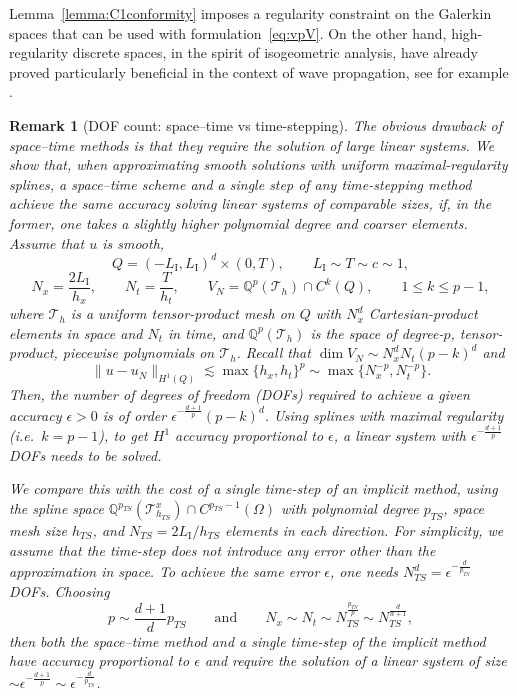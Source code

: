 \documentclass[a4paper]{article}
\theoremstyle{plain}
\newtheorem{remark}[theorem]{Remark}
\theoremstyle{definition}
\newcommand{\LI}{L_{\mathrm I}}
\begin{document}
Lemma~\ref{lemma:C1conformity} imposes a regularity constraint on the Galerkin spaces that can be used with formulation~\eqref{eq:vpV}.
On the other hand, high-regularity discrete spaces, in the spirit of isogeometric analysis, have already proved particularly beneficial in the context of wave propagation, see for example \cite{HughesRealiSangalli2008, PavarinoZampieri2021, FraschiniLoliMoiolaSangalli2023}.

\begin{remark}[DOF count: space--time vs time-stepping]\label{rem:DOFcount}
The obvious drawback of space--time methods is that they require the solution of large linear systems.
We show that,
when approximating smooth solutions with uniform
maximal-regularity splines,
a space--time scheme and a single step of any time-stepping method achieve the same accuracy solving linear systems of comparable sizes, if, in the former, one takes a slightly higher polynomial degree and coarser elements.
Assume that $u$ is smooth,
	\begin{equation*}
		Q = \left(-\LI, \LI \right)^d\times(0,T), \qquad \LI\sim T\sim c\sim1,
	\end{equation*}
	\begin{equation*}
		N_x  = \frac{2\LI}{h_x}, \qquad N_t = \frac{T}{h_t}, \qquad V_N = \mathbb Q^p(\mathcal T_h)\cap C^k(Q), \qquad  1\le k\le p-1,
	\end{equation*}
	where $\mathcal T_h$ is a uniform tensor-product mesh on $Q$ with $N_x^d$ Cartesian-product elements in space and $N_t$ in time, and $\mathbb Q^p(\mathcal T_h)$ is the space of degree-$p$, tensor-product, piecewise polynomials on $\mathcal T_h$.
Recall that $\dim V_N\sim N_x^dN_t(p-k)^d$ and
	\begin{equation*}
		\|u - u_N\|_{H^1(Q)} \lesssim \max\{h_x,h_t\}^p \sim \max\{N_x^{-p}, N_t^{-p}\}.
	\end{equation*}
	Then, the number of degrees of freedom (DOFs) required to achieve a given accuracy $\epsilon>0$ is of order $\epsilon^{-\frac{d+1}{p}}(p-k)^d$.
	Using splines with maximal regularity (i.e.\ $k = p - 1$), to get $H^1$ accuracy proportional to $\epsilon$, a linear system with $\epsilon^{-\frac{d+1}{p}}$ DOFs needs to be solved.

We compare this with the cost of a single time-step of an implicit method, using the spline space
$\mathbb Q^{p_{TS}}(\mathcal T_{h_{TS}}^x)\cap C^{p_{TS}-1}(\Omega)$
with polynomial degree $p_{TS}$, space mesh size $h_{TS}$, and  $N_{TS}=2\LI/h_{TS}$ elements in each direction.
For simplicity, we assume that the time-step does not introduce any error other than the approximation in space.
To achieve the same error $\epsilon$, one needs $N_{TS}^d = \epsilon^{-\frac{d}{p_{TS}}}$ DOFs.
Choosing
$$
p\sim \frac{d+1}d p_{TS}\qquad\text{and}\qquad
N_x \sim N_t \sim N_{TS}^{\frac{p_{TS}}{p}}\sim N_{TS}^{\frac{d}{d+1}},
$$
then both the space--time method and a single time-step of the implicit method have accuracy proportional to $\epsilon$ and require the solution of a linear system of size $\sim \epsilon^{-\frac{d+1}p}\sim\epsilon^{-\frac{d}{p_{TS}}}$.


\end{remark}
\end{document}
